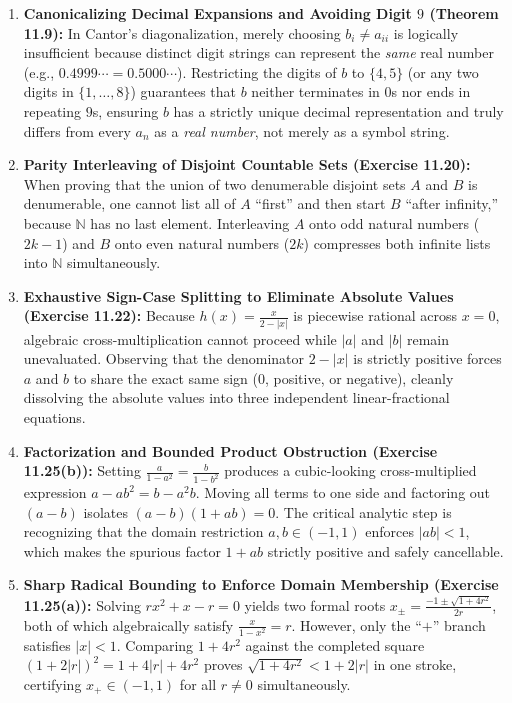 \documentclass[11pt, letterpaper]{article}
\theoremstyle{definition}
\theoremstyle{remark}
\begin{document}
\begin{enumerate}
    \item \textbf{Canonicalizing Decimal Expansions and Avoiding Digit $9$ (Theorem 11.9):}
    In Cantor's diagonalization, merely choosing $b_i \neq a_{ii}$ is logically insufficient because distinct digit strings can represent the \emph{same} real number (e.g., $0.4999\cdots = 0.5000\cdots$). Restricting the digits of $b$ to $\{4, 5\}$ (or any two digits in $\{1, \dots, 8\}$) guarantees that $b$ neither terminates in $0$s nor ends in repeating $9$s, ensuring $b$ has a strictly unique decimal representation and truly differs from every $a_n$ as a \emph{real number}, not merely as a symbol string.

    \item \textbf{Parity Interleaving of Disjoint Countable Sets (Exercise 11.20):}
    When proving that the union of two denumerable disjoint sets $A$ and $B$ is denumerable, one cannot list all of $A$ ``first'' and then start $B$ ``after infinity,'' because $\mathbb{N}$ has no last element. Interleaving $A$ onto odd natural numbers ($2k - 1$) and $B$ onto even natural numbers ($2k$) compresses both infinite lists into $\mathbb{N}$ simultaneously.

    \item \textbf{Exhaustive Sign-Case Splitting to Eliminate Absolute Values (Exercise 11.22):}
    Because $h(x) = \frac{x}{2 - |x|}$ is piecewise rational across $x = 0$, algebraic cross-multiplication cannot proceed while $|a|$ and $|b|$ remain unevaluated. Observing that the denominator $2 - |x|$ is strictly positive forces $a$ and $b$ to share the exact same sign ($0$, positive, or negative), cleanly dissolving the absolute values into three independent linear-fractional equations.

    \item \textbf{Factorization and Bounded Product Obstruction (Exercise 11.25(b)):}
    Setting $\frac{a}{1 - a^2} = \frac{b}{1 - b^2}$ produces a cubic-looking cross-multiplied expression $a - ab^2 = b - a^2 b$. Moving all terms to one side and factoring out $(a - b)$ isolates $(a - b)(1 + ab) = 0$. The critical analytic step is recognizing that the domain restriction $a, b \in (-1, 1)$ enforces $|ab| < 1$, which makes the spurious factor $1 + ab$ strictly positive and safely cancellable.

    \item \textbf{Sharp Radical Bounding to Enforce Domain Membership (Exercise 11.25(a)):}
    Solving $rx^2 + x - r = 0$ yields two formal roots $x_\pm = \frac{-1 \pm \sqrt{1 + 4r^2}}{2r}$, both of which algebraically satisfy $\frac{x}{1 - x^2} = r$. However, only the ``$+$'' branch satisfies $|x| < 1$. Comparing $1 + 4r^2$ against the completed square $(1 + 2|r|)^2 = 1 + 4|r| + 4r^2$ proves $\sqrt{1 + 4r^2} < 1 + 2|r|$ in one stroke, certifying $x_+ \in (-1, 1)$ for all $r \neq 0$ simultaneously.


\end{enumerate}
\end{document}
